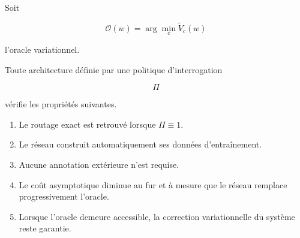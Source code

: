 \begin{theorem}

Soit

\[
\mathcal O(w)
=
\arg\min_{c}
\widetilde V_c(w)
\]

l'oracle variationnel.

Toute architecture définie par une politique
d'interrogation

\[
\Pi
\]

vérifie les propriétés suivantes.

\begin{enumerate}

\item
Le routage exact est retrouvé lorsque
\(
\Pi\equiv1.
\)

\item
Le réseau construit automatiquement ses données
d'entraînement.

\item
Aucune annotation extérieure n'est requise.

\item
Le coût asymptotique diminue au fur et à mesure que
le réseau remplace progressivement l'oracle.

\item
Lorsque l'oracle demeure accessible,
la correction variationnelle du système reste garantie.

\end{enumerate}

\end{theorem}
